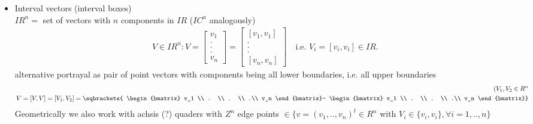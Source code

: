 \begin{itemize}
\item Interval vectors (interval boxes) \\
$IR^n =$ set of vectors with $n$ components in $IR$ ($IC^n$ analogously)
\begin{align*}
V\in IR^n: V=
	\begin{bmatrix}
		v_1 \\
		. \\
		. \\
		.\\
		v_n
	\end{bmatrix}= 
	\begin{bmatrix}
		[v_1,v_1] \\
		. \\
		. \\
		.\\
		[v_n,v_n]
	\end{bmatrix} \quad \text{i.e. } V_i=[v_i,v_i] \in IR.
\end{align*}
alternative portrayal as pair of point vectors with components being all lower boundaries, i.e. all upper boundaries
\begin{align*}
	(V_1,V_2 \in R^n \\
	V=[V,V]=[V_1,V_2]=\sqbrackets{
	\begin{bmatrix}
		v_1 \\
		 . \\
		  . \\
		   .\\
		    v_n
	 \end{bmatrix}-
	 \begin{bmatrix}
	 v_1 \\
	  . \\
	   . \\
	    .\\
	     v_n
	 \end{bmatrix}}
\end{align*}
Geometrically we also work with achsis (?) quaders with $Z^n$ edge points $\in \{v=(v_1,..,v_n)^t\in R^n$ with $V_i\in\{v_i,v_i\}, \forall i=1,..,n\}$ \\


\end{itemize}
